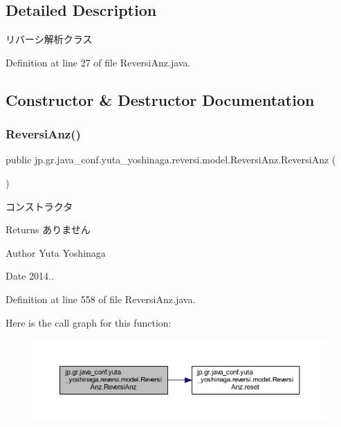\subsection{Detailed Description}
リバーシ解析クラス 

Definition at line 27 of file Reversi\+Anz.\+java.



\subsection{Constructor \& Destructor Documentation}
\mbox{\label{classjp_1_1gr_1_1java__conf_1_1yuta__yoshinaga_1_1reversi_1_1model_1_1_reversi_anz_a130d4d7b3641a385209d1596c2f3e024}} 
\subsubsection{\texorpdfstring{Reversi\+Anz()}{ReversiAnz()}}
{\footnotesize\ttfamily public jp.\+gr.\+java\+\_\+conf.\+yuta\+\_\+yoshinaga.\+reversi.\+model.\+Reversi\+Anz.\+Reversi\+Anz (\begin{DoxyParamCaption}{ }\end{DoxyParamCaption})}



コンストラクタ 

\begin{DoxyReturn}{Returns}
ありません 
\end{DoxyReturn}
\begin{DoxyAuthor}{Author}
Yuta Yoshinaga 
\end{DoxyAuthor}
\begin{DoxyDate}{Date}
2014.. 
\end{DoxyDate}


Definition at line 558 of file Reversi\+Anz.\+java.

Here is the call graph for this function\+:
\nopagebreak
\begin{figure}[H]
\begin{center}
\leavevmode
\includegraphics[width=350pt]{classjp_1_1gr_1_1java__conf_1_1yuta__yoshinaga_1_1reversi_1_1model_1_1_reversi_anz_a130d4d7b3641a385209d1596c2f3e024_cgraph}
\end{center}
\end{figure}


